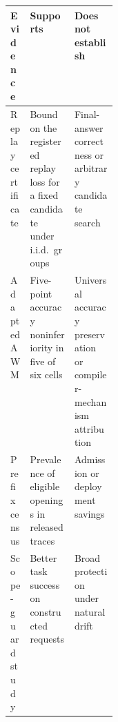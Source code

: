 \begin{tabularx}{\linewidth}{@{}p{0.18\linewidth}XX@{}}
\toprule
Evidence & Supports & Does not establish \\
\midrule
Replay certificate & Bound on the registered replay loss for a fixed candidate under i.i.d.\ groups & Final-answer correctness or arbitrary candidate search \\
Adapted AWM & Five-point accuracy noninferiority in five of six cells & Universal accuracy preservation or compiler-mechanism attribution \\
Prefix census & Prevalence of eligible openings in released traces & Admission or deployment savings \\
Scope-guard study & Better task success on constructed requests & Broad protection under natural drift \\
\bottomrule
\end{tabularx}
